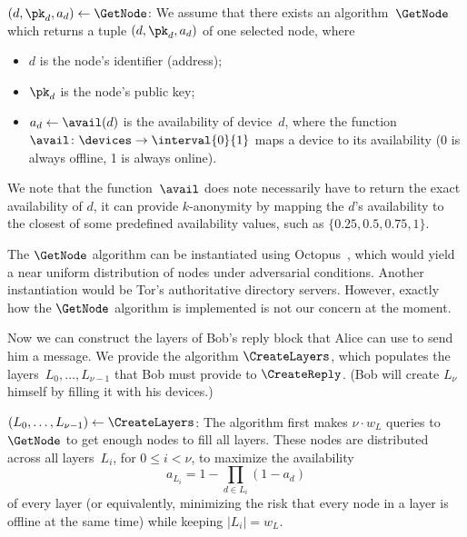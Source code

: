 \((d, \pk_d, a_d)\gets \GetNode\): We assume that there exists an 
algorithm~\(\GetNode\) which returns a tuple \((d, \pk_d, a_d)\) of one 
selected node, where
\begin{itemize}
  \item \(d\) is the node's identifier (address);
  \item \(\pk_d\) is the node's public key;
  \item \(a_d\gets \avail(d)\) is the availability of device~\(d\), where the 
    function~\(\avail\colon \devices\to \interval{0}{1}\) maps a device to its 
    availability (0 is always offline, 1 is always online).
\end{itemize}
We note that the function~\(\avail\) does note necessarily have to return the 
exact availability of \(d\), \eg it can provide \(k\)-anonymity by mapping the 
\(d\)'s availability to the closest of some predefined availability values, 
such as \(\{0.25, 0.5, 0.75, 1\}\).

The \(\GetNode\) algorithm can be instantiated using \eg
Octopus~\cite{Octopus}, which would yield a near uniform distribution of nodes 
under adversarial conditions.
Another instantiation would be Tor's authoritative directory servers.
However, exactly how the \(\GetNode\) algorithm is implemented is not our 
concern at the moment.

Now we can construct the layers of Bob's reply block that Alice can use to send 
him a message.
We provide the algorithm \(\CreateLayers\), which populates the layers~\(L_0, 
\dotsc, L_{\nu-1}\) that Bob must provide to \(\CreateReply\).
(Bob will create \(L_\nu\) himself by filling it with his devices.)

\((L_0, \dotsc, L_{\nu-1}) \gets \CreateLayers\):
The algorithm first makes \(\nu\cdot w_L\) queries to \(\GetNode\) to get 
enough nodes to fill all layers.
These nodes are distributed across all layers~\(L_i\), for \(0\leq i < \nu\), 
to maximize the availability~\[
  a_{L_i} = 1 - \prod_{d\in L_i} (1-a_d)
\] of every layer (or equivalently, minimizing the risk that every node in a 
layer is offline at the same time) while keeping \(|L_i| = w_L\).

